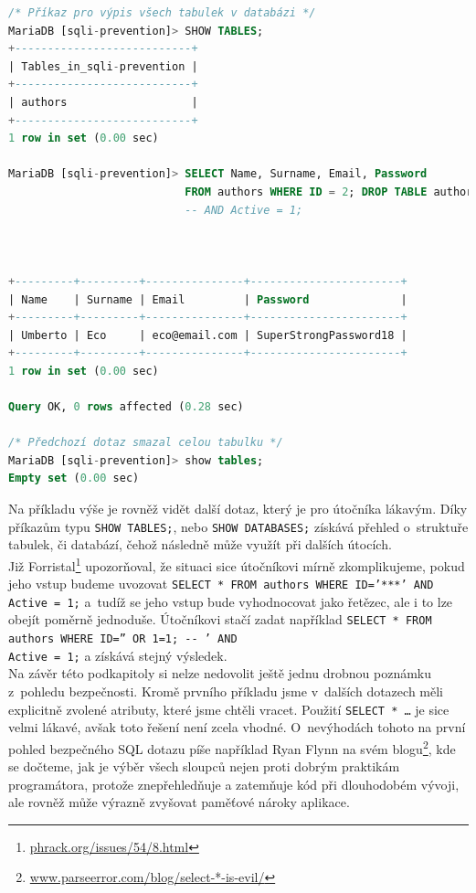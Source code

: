 \begin{lstlisting}[language=sql]
/* Příkaz pro výpis všech tabulek v databázi */
MariaDB [sqli-prevention]> SHOW TABLES;
+---------------------------+
| Tables_in_sqli-prevention |
+---------------------------+
| authors                   |
+---------------------------+
1 row in set (0.00 sec)

MariaDB [sqli-prevention]> SELECT Name, Surname, Email, Password 
                           FROM authors WHERE ID = 2; DROP TABLE authors; 
                           -- AND Active = 1;



+---------+---------+---------------+-----------------------+
| Name    | Surname | Email         | Password              |
+---------+---------+---------------+-----------------------+
| Umberto | Eco     | eco@email.com | SuperStrongPassword18 |
+---------+---------+---------------+-----------------------+
1 row in set (0.00 sec)

Query OK, 0 rows affected (0.28 sec)

/* Předchozí dotaz smazal celou tabulku */
MariaDB [sqli-prevention]> show tables;
Empty set (0.00 sec)
\end{lstlisting}

Na příkladu výše je rovněž vidět další dotaz, který je pro útočníka lákavým. Díky příkazům typu \texttt{SHOW TABLES;}, nebo
\texttt{SHOW DATABASES;} získává přehled o~struktuře tabulek, či databází, čehož následně může využít při dalších útocích. \\

Již Forristal\footnote{\url{phrack.org/issues/54/8.html}} upozorňoval, že situaci sice útočníkovi mírně zkomplikujeme,
pokud jeho vstup budeme uvozovat \texttt{SELECT * FROM authors WHERE ID='***' AND Active = 1;} a~tudíž se jeho vstup bude vyhodnocovat jako řetězec,
ale i to lze obejít poměrně jednoduše. Útočníkovi stačí zadat například \texttt{SELECT * FROM authors WHERE ID='' OR 1=1; -{}- ' AND \\ Active = 1;}
a získává stejný výsledek. \\

Na závěr této podkapitoly si nelze nedovolit ještě jednu drobnou poznámku z~pohledu bezpečnosti. Kromě prvního příkladu jsme
v~dalších dotazech měli explicitně zvolené atributy, které jsme chtěli vracet. Použití \texttt{SELECT * \dots} je sice
velmi lákavé, avšak toto řešení není zcela vhodné. O~nevýhodách tohoto na první pohled bezpečného SQL dotazu píše například Ryan Flynn na svém 
blogu\footnote{\url{www.parseerror.com/blog/select-*-is-evil/}}, kde se dočteme, jak je výběr všech sloupců nejen proti dobrým praktikám 
programátora, protože znepřehledňuje a zatemňuje kód při dlouhodobém vývoji, ale rovněž může výrazně zvyšovat paměťové nároky aplikace. 

